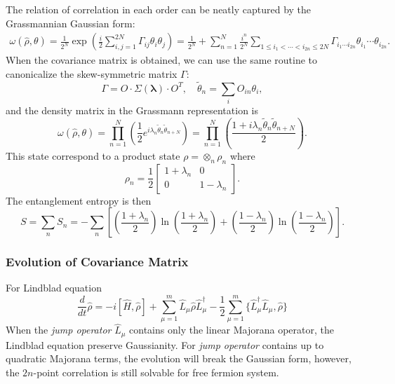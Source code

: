 \documentclass[aps,prb,superscriptaddress,nofootinbib]{revtex4}
\begin{document}
The relation of correlation in each order can be neatly captured by the Grassmannian Gaussian form:
\begin{equation}
\begin{aligned}
	\omega(\hat \rho, \theta) 
	= \frac{1}{2^N} \exp \left(\frac{i}{2} \sum_{i,j=1}^{2N}\Gamma_{ij}\theta_i \theta_j \right)
	=\frac{1}{2^N} + \sum_{n=1}^{N}\frac{i^n}{2^N}\sum_{1\le i_{1}<\cdots<i_{2n} \le 2N}\Gamma_{i_{1}\cdots i_{2n}} \theta_{i_1} \cdots \theta_{i_{2n}}.
\end{aligned}
\end{equation}
When the covariance matrix is obtained, we can use the same routine to canonicalize the skew-symmetric matrix $\Gamma$:
\begin{equation*}
	\Gamma = O \cdot \Sigma(\bm \lambda) \cdot O^T, \quad
	\tilde\theta_n = \sum_i O_{in} \theta_i,
\end{equation*}
and the density matrix in the Grassmann representation is
\begin{equation}
	\omega(\hat \rho, \theta) 
	= \prod_{n=1}^N \left(\frac{1}{2} e^{i \lambda_n \tilde\theta_n \tilde\theta_{n+N}} \right)
	= \prod_{n=1}^N \left(\frac{1+i\lambda_n \tilde\theta_n\tilde\theta_{n+N}}{2}  \right).
\end{equation}
This state correspond to a product state $\rho = \otimes_n \rho_n$ where
\begin{equation}
	\rho_n = \frac{1}{2} \left[\begin{array}{cc}
		1 + \lambda_n & 0 \\
		0 & 1 - \lambda_n
	\end{array} \right].
\end{equation}
The entanglement entropy is then
\begin{equation}
	S=\sum_n S_n = -\sum_n \left[
	\left(\frac{1+\lambda_n}{2}\right)\ln\left(\frac{1+\lambda_n}{2}\right)
	+ \left(\frac{1-\lambda_n}{2}\right)\ln\left(\frac{1-\lambda_n}{2}\right)\right].
\end{equation}




\subsubsection{Evolution of Covariance Matrix}
For Lindblad equation
\begin{equation}
	\frac{d}{dt} \hat\rho = -i[\hat H, \hat \rho] + \sum_{\mu=1}^{m} \hat L_\mu \hat\rho \hat L_\mu^\dagger -\frac{1}{2} \sum_{\mu=1}^{m} \{\hat L_\mu^\dagger \hat L_\mu, \hat \rho\}
\end{equation}
When the \textit{jump operator} $\hat L_\mu$ contains only the linear Majorana operator, the Lindblad equation preserve Gaussianity. 
For \textit{jump operator} contains up to quadratic Majorana terms, the evolution will break the Gaussian form, however, the $2n$-point correlation is still solvable for free fermion system.
\end{document}
